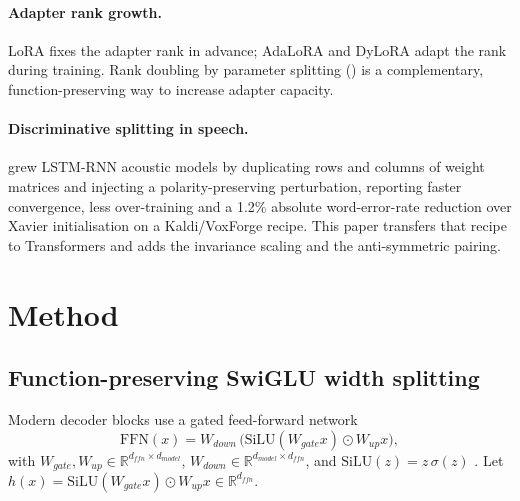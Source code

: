 \paragraph{Adapter rank growth.}
LoRA \citep{hu2021lora} fixes the adapter rank in advance; AdaLoRA \citep{zhang2023adalora} and DyLoRA \citep{valipour2023dylora} adapt the rank during training. Rank doubling by parameter splitting () is a complementary, function-preserving way to increase adapter capacity.

\paragraph{Discriminative splitting in speech.}
\citet{irfan2021discriminative} grew LSTM-RNN acoustic models by duplicating rows and columns of weight matrices and injecting a polarity-preserving perturbation, reporting faster convergence, less over-training and a 1.2\% absolute word-error-rate reduction over Xavier initialisation on a Kaldi/VoxForge recipe. This paper transfers that recipe to Transformers and adds the invariance scaling and the anti-symmetric pairing.

\section{Method}
\subsection{Function-preserving SwiGLU width splitting}
\label{sec:split}
Modern decoder blocks \citep{shazeer2020glu,touvron2023llama,qwen2024technical} use a gated feed-forward network
\begin{equation}
    \mathrm{FFN}(x) = W_{down}\,\big(\mathrm{SiLU}(W_{gate}x) \odot W_{up}x\big),
    \label{eq:swiglu}
\end{equation}
with $W_{gate},W_{up}\in\mathbb{R}^{d_{ffn}\times d_{model}}$, $W_{down}\in\mathbb{R}^{d_{model}\times d_{ffn}}$, and $\mathrm{SiLU}(z)=z\,\sigma(z)$ \citep{hendrycks2016gelu,elfwing2018silu,ramachandran2017swish}. Let $h(x)=\mathrm{SiLU}(W_{gate}x)\odot W_{up}x\in\mathbb{R}^{d_{ffn}}$.


